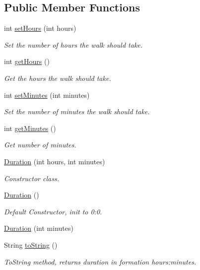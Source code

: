 \subsection*{Public Member Functions}
\begin{DoxyCompactItemize}
\item 
int \hyperlink{classuk_1_1ac_1_1swan_1_1digitaltrails_1_1utils_1_1_duration_a98f0315c584688d9977c7741329f4324}{set\+Hours} (int hours)
\begin{DoxyCompactList}\small\item\em Set the number of hours the walk should take. \end{DoxyCompactList}\item 
int \hyperlink{classuk_1_1ac_1_1swan_1_1digitaltrails_1_1utils_1_1_duration_a3de407ce94342dd17fa0dfbf7fee9e73}{get\+Hours} ()
\begin{DoxyCompactList}\small\item\em Get the hours the walk should take. \end{DoxyCompactList}\item 
int \hyperlink{classuk_1_1ac_1_1swan_1_1digitaltrails_1_1utils_1_1_duration_a44eba958b5ade57a5d04018dd54f3a8a}{set\+Minutes} (int minutes)
\begin{DoxyCompactList}\small\item\em Set the number of minutes the walk should take. \end{DoxyCompactList}\item 
int \hyperlink{classuk_1_1ac_1_1swan_1_1digitaltrails_1_1utils_1_1_duration_aa3990901c7030ecbc2f380c2aed52b64}{get\+Minutes} ()
\begin{DoxyCompactList}\small\item\em Get number of minutes. \end{DoxyCompactList}\item 
\hyperlink{classuk_1_1ac_1_1swan_1_1digitaltrails_1_1utils_1_1_duration_a2c6762ee7898586c3d43dca589b12bd8}{Duration} (int hours, int minutes)
\begin{DoxyCompactList}\small\item\em Constructor class. \end{DoxyCompactList}\item 
\hyperlink{classuk_1_1ac_1_1swan_1_1digitaltrails_1_1utils_1_1_duration_ad1bb7834390fbe1d08b60bf43c94d57c}{Duration} ()
\begin{DoxyCompactList}\small\item\em Default Constructor, init to 0\+:0. \end{DoxyCompactList}\item 
\hyperlink{classuk_1_1ac_1_1swan_1_1digitaltrails_1_1utils_1_1_duration_af9e99772ccdb3980fec2d978b5f5df25}{Duration} (int minutes)
\item 
String \hyperlink{classuk_1_1ac_1_1swan_1_1digitaltrails_1_1utils_1_1_duration_a015090cd1cc306c68937a07e7c580951}{to\+String} ()
\begin{DoxyCompactList}\small\item\em To\+String method, returns duration in formation hours\+:minutes. \end{DoxyCompactList}\end{DoxyCompactItemize}
